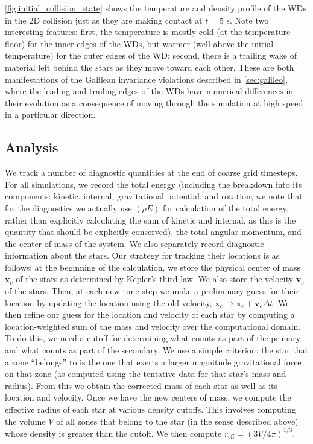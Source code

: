 \documentclass[12pt]{article}
\begin{document}
\autoref{fig:initial_collision_state} shows the temperature and density profile
of the WDs in the 2D collision just as they are making contact at $t = 5$ s. Note
two interesting features: first, the temperature is mostly cold (at the temperature floor)
for the inner edges of the WDs, but warmer (well above the initial temperature) for the
outer edges of the WD; second, there is a trailing wake of material left behind the
stars as they move toward each other. These are both manifestations of the Galilean
invariance violations described in \autoref{sec:galileo}, where the leading and trailing
edges of the WDs have numerical differences in their evolution as a consequence of
moving through the simulation at high speed in a particular direction.



\subsection{Analysis}
\label{sec:analysis}

We track a number of diagnostic quantities at the end of coarse grid timesteps.
For all simulations, we record the total energy (including the breakdown into
its components: kinetic, internal, gravitational potential, and rotation; we note
that for the diagnostics we actually use $(\rho E)$ for calculation of the total energy,
rather than explicitly calculating the sum of kinetic and internal, as this is
the quantity that should be explicitly conserved),
the total angular momentum, and the center of mass of the system.
We also separately record diagnostic
information about the stars. Our strategy for tracking their
locations is as follows: at the beginning of the calculation, we store the
physical center of mass $\mathbf{x}_{c}$ of the stars as determined
by Kepler's third law. We also store the velocity $\mathbf{v}_{c}$
of the stars. Then, at each new time step we make a preliminary guess for their
location by updating the location using the old velocity,
$\mathbf{x}_{c} \rightarrow \mathbf{x}_{c} + \mathbf{v}_{c} \Delta t$.
We then refine our guess for the location and velocity of each star by computing a
location-weighted sum of the mass and velocity over the computational domain.
To do this, we need a cutoff for determining what counts as part of the primary
and what counts as part of the secondary. We use a simple criterion: the star
that a zone ``belongs'' to is the one that exerts a larger magnitude
gravitational force on that zone (as computed using the tentative data
for that star's mass and radius). From this we obtain the corrected mass
of each star as well as its location and velocity. Once we have the new centers of mass,
we compute the effective radius of each star at various density cutoffs. This involves
computing the volume $V$ of all zones that belong to the star (in the sense described above)
whose density is greater than the cutoff. We then compute $r_{\text{eff}} = (3V/4\pi)^{1/3}.$
\end{document}

